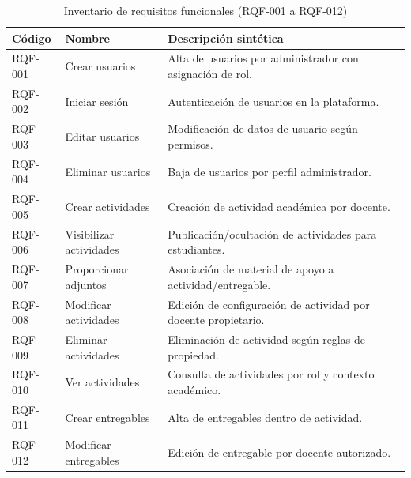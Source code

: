 \begin{table}[!htbp]
\centering
\small
\begin{tabular}{|P{1.4cm}|P{3.3cm}|P{7.1cm}|}
\hline
\textbf{C\'odigo} & \textbf{Nombre} & \textbf{Descripci\'on sint\'etica} \\
\hline
RQF-001 & Crear usuarios & Alta de usuarios por administrador con asignaci\'on de rol. \\
\hline
RQF-002 & Iniciar sesi\'on & Autenticaci\'on de usuarios en la plataforma. \\
\hline
RQF-003 & Editar usuarios & Modificaci\'on de datos de usuario seg\'un permisos. \\
\hline
RQF-004 & Eliminar usuarios & Baja de usuarios por perfil administrador. \\
\hline
RQF-005 & Crear actividades & Creaci\'on de actividad acad\'emica por docente. \\
\hline
RQF-006 & Visibilizar actividades & Publicaci\'on/ocultaci\'on de actividades para estudiantes. \\
\hline
RQF-007 & Proporcionar adjuntos & Asociaci\'on de material de apoyo a actividad/entregable. \\
\hline
RQF-008 & Modificar actividades & Edici\'on de configuraci\'on de actividad por docente propietario. \\
\hline
RQF-009 & Eliminar actividades & Eliminaci\'on de actividad seg\'un reglas de propiedad. \\
\hline
RQF-010 & Ver actividades & Consulta de actividades por rol y contexto acad\'emico. \\
\hline
RQF-011 & Crear entregables & Alta de entregables dentro de actividad. \\
\hline
RQF-012 & Modificar entregables & Edici\'on de entregable por docente autorizado. \\
\hline
\end{tabular}
\normalsize
\caption{Inventario de requisitos funcionales (RQF-001 a RQF-012)}
\label{tab:rqf-inventario-1}
\end{table}

